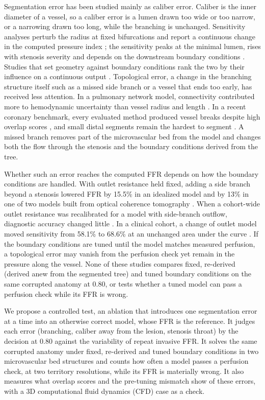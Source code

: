 \documentclass[journal,twoside,web]{ieeecolor}
\begin{document}
Segmentation error has been studied mainly as caliber error. Caliber is the inner diameter of a vessel, so a caliber error is a lumen drawn too wide or too narrow, or a narrowing drawn too long, while the branching is unchanged. Sensitivity analyses perturb the radius at fixed bifurcations and report a continuous change in the computed pressure index \cite{sankaran2015tmi,sankaran2015cmame,fernandez2024,dalmaso2025}; the sensitivity peaks at the minimal lumen, rises with stenosis severity \cite{fernandez2024} and depends on the downstream boundary conditions \cite{sankaran2015tmi}. Studies that set geometry against
boundary conditions rank the two by their influence on a continuous output \cite{sankaran2016,tanade2022,korte2023}. Topological error, a change in the branching structure itself such as a missed side branch or a vessel that ends too early, has received less attention. In a pulmonary network model, connectivity contributed more to hemodynamic uncertainty than vessel radius and
length \cite{colebank2019}. In a recent coronary benchmark, every evaluated method produced vessel breaks despite high overlap scores \cite{bransby2026}, and small distal segments remain the hardest to segment
\cite{chen2025}. A missed branch removes part of the microvascular bed from the model and changes both the flow
through the stenosis and the boundary conditions derived from the tree.

Whether such an error reaches the computed FFR depends on how the boundary conditions are handled. With outlet resistance held fixed, adding a side branch beyond a stenosis lowered FFR by 15.5\% in an idealized model and by 13\% in one of two models built from optical coherence tomography \cite{gamage2022}. When a cohort-wide outlet resistance was recalibrated for a model with side-branch outflow, diagnostic accuracy changed little \cite{gosling2020}. In a clinical cohort, a change of outlet model moved sensitivity from 58.1\% to 68.6\% at an unchanged area under
the curve \cite{fossan2026}. If the boundary conditions are tuned until the model matches measured perfusion, a topological error may vanish
from the perfusion check yet remain in the pressure along the vessel. None of these studies compares fixed, re-derived (derived anew from the segmented tree) and tuned boundary conditions on the same corrupted anatomy at
0.80, or tests whether a tuned model can pass a perfusion check while its FFR is wrong.

We propose a controlled test, an ablation that introduces one segmentation error at a time into an otherwise correct
model, whose FFR is the reference. It judges each error (branching, caliber away from the lesion, stenosis throat) by the decision at 0.80 against the variability of repeat invasive FFR. It solves the same corrupted anatomy under fixed, re-derived and tuned boundary conditions in two microvascular bed structures and counts how often a model passes a perfusion check, at two territory resolutions, while its FFR is materially wrong. It also measures what overlap scores and the pre-tuning mismatch show of these errors, with a 3D computational fluid
dynamics (CFD) case as a check.
\end{document}
